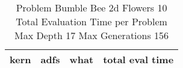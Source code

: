 \begin{table}[H]
\caption{Problem  Bumble Bee 2d  Flowers 10\\Total Evaluation Time per Problem \\ Max Depth 17 Max Generations 156\\}
\begin{center}
\scalebox{1.0} %
{
\begin{tabular}{lllr}
\hline
kern & adfs & what & total eval time \\
\hline


\end{tabular}
}
\end{center}
\end{table}

